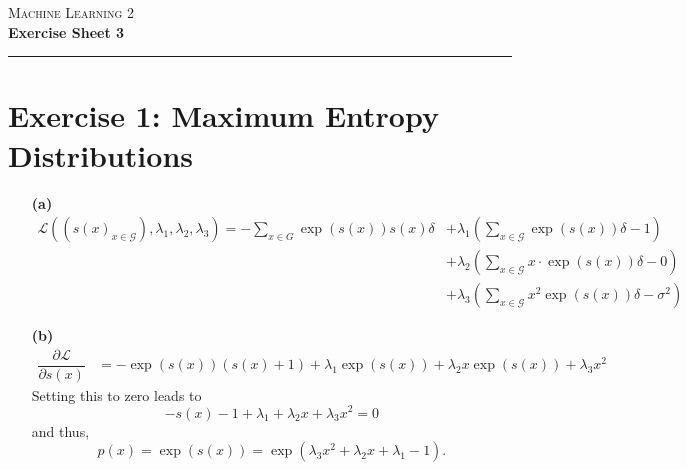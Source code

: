 \documentclass{article}
\newcommand{\prob}[1]{p\!\left(#1\right)}
\newcommand{\lagr}{\mathcal{L}}
\newcommand{\lagrange}[1]{\mathcal{L}\left( #1 \right)}
\newcommand{\G}{\mathcal{G}}
\begin{document}
\begin{center}
	\Huge \textsc{Machine Learning 2} \\
    \Large \textbf{Exercise Sheet 3}
\end{center}

\hrule

\section*{Exercise 1: Maximum Entropy Distributions} 
\begin{itemize}
\item[\textbf{(a)}]
\begin{align*}
\lagrange{(s(x)_{x\in\G}), \lambda_1, \lambda_2, \lambda_3} = 
	- \sum_{x \in G} \exp(s(x))s(x) \delta 
		&+ \lambda_1 \left( \sum_{x\in\G} \exp(s(x))\delta - 1 \right) \\ 
		&+ \lambda_2 \left( \sum_{x\in\G} x \cdot \exp(s(x)) \delta - 0 \right) \\
		&+ \lambda_3 \left( \sum_{x\in\G} x^2 \exp(s(x)) \delta - \sigma^2 \right)
\end{align*}
\item[\textbf{(b)}]
\begin{align*}
\dfrac{\partial \lagr}{\partial s(x)}
	&= - \exp(s(x))(s(x)+1)+\lambda_1\exp(s(x)) + \lambda_2x\exp(s(x)) + \lambda_3x^2
\end{align*}
Setting this to zero leads to
\[ -s(x)-1 + \lambda_1 + \lambda_2x + \lambda_3x^2=0 \]
and thus,
\[ \prob{x} = \exp(s(x)) = \exp(\lambda_3x^2 + \lambda_2x+\lambda_1-1) .\]
\end{itemize}
\end{document}
